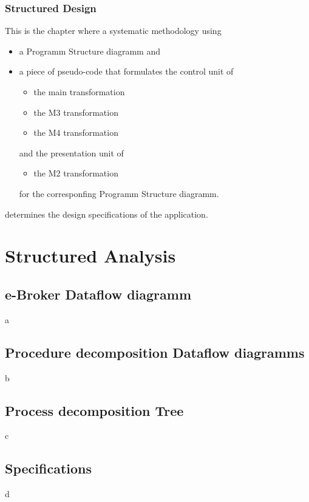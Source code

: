 \documentclass{article}
\begin{document}
\subsubsection{Structured Design}
This is the chapter where a systematic methodology using
\begin{itemize}
\item a Programm Structure diagramm and 
\item a piece of pseudo-code that formulates the control unit of
\begin{itemize}[{label=$\circ$}]
\item the main transformation 
\item the M3 transformation 
\item the M4 transformation
\end{itemize}
and the presentation unit of
\begin{itemize}[{label=$\circ$}]
\item the M2 transformation 
\end{itemize}
for the corresponfing Programm Structure diagramm.
\end{itemize}
determines the design specifications of the application. 

\newpage
\section{Structured Analysis}
\subsection{e-Broker Dataflow diagramm}
a

\subsection{Procedure decomposition Dataflow diagramms}
b

\subsection{Process decomposition Tree}
c

\subsection{Specifications}
d
\end{document}
